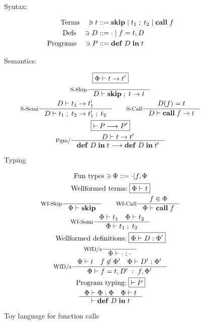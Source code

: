 \documentclass[a4paper, oneside, 10pt, final]{memoir}
\begin{document}
\newcommand{\fskip}{\mathbf{skip}}
\newcommand{\fsemi}[2]{#1 \; ; \; #2}
\newcommand{\fcall}[1]{\mathbf{call} \; #1}
\newcommand{\fpgm}[2]{\mathbf{def} \; #1 \; \mathbf{in} \; #2}
\begin{figure}
  \begin{center}
    Syntax:
  \end{center}
  \begin{align*}
    \text{Terms} \quad \ni t & ::= \fskip{} \bor \fsemi{t_1}{t_2} \bor
    \fcall{f}\\
    \text{Defs} \quad \ni D & ::= \cdot \bor f = t, D\\
    \text{Programs} \quad \ni P & ::= \fpgm{D}{t}
  \end{align*}
  \begin{center}
    Semantics:
  \end{center}
  \begin{gather*}
    \boxed{\Phi |- t -> t'}\\
    \inference[S-Skip]{}{D |- \fsemi{\fskip{}}{t} -> t}\\
    \inference[S-Semi]{D |- t_1 -> t'_1}{D |- \fsemi{t_1}{t_2}
      -> \fsemi{t'_1}{t_2}} \quad \quad
    \inference[S-Call]{D(f) = t}{D |- \fcall{f} -> t}\\
    \boxed{|- P --> P'}\\
    \inference[Pgm/]{D |- t -> t'}{\fpgm{D}{t} --> \fpgm{D}{t'}}
  \end{gather*}
  \begin{center}
    Typing
  \end{center}
  \begin{gather*}
    \text{Fun types} \ni \Phi ::= \cdot | f,\Phi\\
    \text{Wellformed terms:} \; \boxed{\Phi |- t}\\
    \inference[Wf-Skip]{}{\Phi |- \fskip{}} \quad \quad
    \inference[Wf-Call]{f \in \Phi}{\Phi |- \fcall{f}}\\
    \inference[Wf-Semi]{\Phi |- t_1 \quad \Phi |- t_2}{\Phi |-
      \fsemi{t_1}{t_2}}\\
    \text{Wellformed definitions:} \; \boxed{\Phi |- D :
      \Phi'}\\
    \inference[WfD/z]{}{\Phi |- \cdot : \cdot}\\
    \inference[WfD/s]{\Phi |- t \quad f \not \in \Phi' \quad
      \Phi |- D' : \Phi'}{\Phi |- f = t, D' \; : \;
      f,\Phi'}\\
    \text{Program typing:} \; \boxed{|- P}\\
    \inference{\Phi |- \Phi : \Phi \quad \Phi |- t}{|- \fpgm{D}{t}}
  \end{gather*}
  \caption{Toy language for function calls}
  \label{fig:func-call-lang}
\end{figure}
\end{document}
